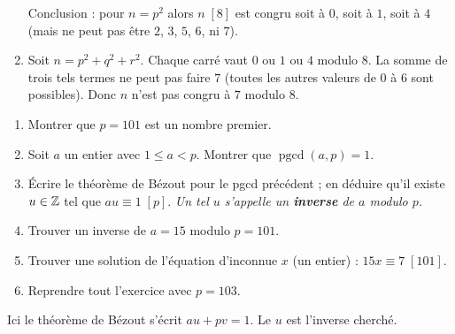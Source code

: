 \documentclass[11pt,class=report,crop=false]{standalone}
\newcommand{\pgcd}{\mathop{\mathrm{pgcd}}\nolimits}
\begin{document}
\begin{enumerate}
Conclusion : pour $n=p^2$ alors $n \; [8]$ est congru soit à $0$, soit à $1$, soit à $4$ (mais ne peut pas être $2$, $3$, $5$, $6$, ni $7$).

%    
%    
  
  \item Soit $n=p^2+q^2+r^2$. Chaque carré vaut $0$ ou $1$ ou $4$ modulo $8$. La somme de trois tels termes ne peut pas faire $7$ (toutes les autres valeurs de $0$ à $6$ sont possibles). Donc $n$ n'est pas congru à $7$ modulo $8$.
\end{enumerate}
\fincorrection
\finexercice

\exercice{}
\enonce
\sauteligne
\begin{enumerate}
    \item Montrer que $p=101$ est un nombre premier.
    \item Soit $a$ un entier avec $1 \le a < p$. Montrer que $\pgcd(a,p)=1$.
    \item \'Ecrire le théorème de Bézout pour le pgcd précédent ; en déduire qu'il existe $u \in \mathbb{Z}$ tel que $au \equiv 1 \; [p]$. \emph{Un tel $u$ s'appelle un \textbf{inverse} de $a$ modulo $p$.}
    \item Trouver un inverse de $a=15$ modulo $p=101$.
    \item Trouver une solution de l'équation d'inconnue $x$ (un entier) : $15x \equiv 7 \; [101]$.   
    \item Reprendre tout l'exercice avec $p=103$.
\end{enumerate} 
\finenonce

\indication
Ici le théorème de Bézout s'écrit $au+pv=1$. Le $u$ est l'inverse cherché.
\finindication
\end{document}
